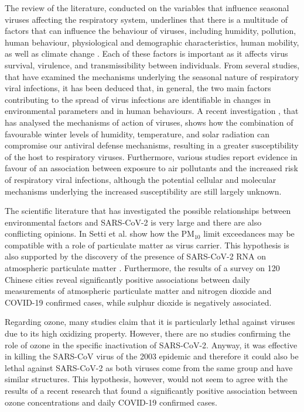 \documentclass[review]{elsarticle}
\begin{document}
The review of the literature, conducted on the variables that influence seasonal viruses affecting the respiratory system, underlines that there is a multitude of factors that can influence the behaviour of viruses, including humidity, pollution, human behaviour, physiological and demographic characteristics, human mobility, as well as climate change \cite{sloan2011impact}. Each of these factors is important as it affects virus survival, virulence, and transmissibility between individuals. From several studies, that have examined the mechanisms underlying the seasonal nature of respiratory viral infections, it has been deduced that, in general, the two main factors contributing to the spread of virus infections are identifiable in changes in environmental parameters and in human behaviours. A recent investigation \cite{moriyama2020seasonality,lolli2020impact}, that has  analysed the mechanisms of action of viruses, shows how the combination of favourable winter levels of humidity, temperature, and solar radiation can compromise our antiviral defense mechanisms, resulting in a greater susceptibility of the host to respiratory viruses. Furthermore, various studies \cite{ciencewicki2007air,xing2016impact,grigg2018air} report evidence in favour of an association between exposure to air pollutants and the increased risk of respiratory viral infections, although the potential cellular and molecular mechanisms underlying the increased susceptibility are still largely unknown.

The scientific literature that has investigated the possible relationships between environmental factors and SARS-CoV-2 is very large and there are also conflicting opinions. In \cite{setti2020evaluation} Setti et al. show how the PM$_{10}$ limit exceedances may be compatible with a role of particulate matter as virus carrier. This hypothesis is also supported by the discovery of the presence of SARS-CoV-2 RNA on atmospheric particulate matter \cite{setti2020sars}. Furthermore, the results of a survey on 120 Chinese cities \cite{yongjian2020association} reveal significantly positive associations between daily measurements of atmospheric particulate matter and nitrogen dioxide and COVID-19 confirmed cases, while sulphur dioxide is negatively associated.

Regarding ozone, many studies \cite{murray2008virion,hudson2009development,tseng2008inactivation} claim that it is particularly lethal against viruses due to its high oxidizing property. However, there are no studies confirming the role of ozone in the specific inactivation of SARS-CoV-2. Anyway, it was effective in killing the SARS-CoV virus of the 2003 epidemic \cite{zhang2004examination} and therefore it could also be lethal against SARS-CoV-2 as both viruses come from the same group and have similar structures. This hypothesis, however, would not seem to agree with the results of a recent research \cite{yongjian2020association} that found a significantly positive association between ozone concentrations and daily COVID-19 confirmed cases.
\end{document}
